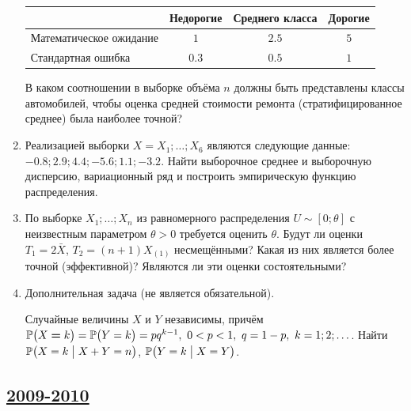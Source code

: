 \begin{enumerate}
\begin{center}
\begin{tabular}{@{}lccc@{}}
\toprule
                        & Недорогие & Среднего класса & Дорогие \\ \midrule
Математическое ожидание & $1$       & $2.5$           & $5$     \\
Стандартная ошибка      & $0.3$     & $0.5$           & $1$     \\ \bottomrule
\end{tabular}
\end{center}

В каком соотношении в выборке объёма $n$ должны быть представлены классы автомобилей,
чтобы оценка средней стоимости ремонта (стратифицированное среднее) была наиболее точной?
\item Реализацией выборки $X=X_1;\ldots;X_6$ являются следующие данные:
$-0.8; 2.9; 4.4; -5.6; 1.1; -3.2$. Найти выборочное среднее и выборочную дисперсию,
вариационный ряд и построить эмпирическую функцию распределения.
\item По выборке $X_1;\ldots;X_n$ из равномерного распределения $U\sim[0;\theta]$
с неизвестным параметром $\theta >0$ требуется оценить $\theta$. Будут ли оценки
$T_1=2\bar{X}$, $T_2=(n+1)X_{(1)}$ несмещёнными? Какая из них является более точной
(эффективной)? Являются ли эти оценки состоятельными?

\item Дополнительная задача (не является обязательной).

Случайные величины $X$ и $Y$ независимы, причём $\P\bigl(X \hm = k \bigr) =
\P\bigl(Y = k\bigr) = pq^{k-1},\ 0<p<1,\ q=1-p,\ k=1;2;\ldots$. Найти
$\P\bigl(X=k \bigm| X+Y=n\bigr)$, $\P\bigl(Y=k\bigm| X=Y\bigr)$.
\end{enumerate}



\newpage
\subsection[2009-2010]{\hyperref[sec:sol_kr_01_2009_2010]{2009-2010}}
\label{sec:kr_01_2009_2010}

